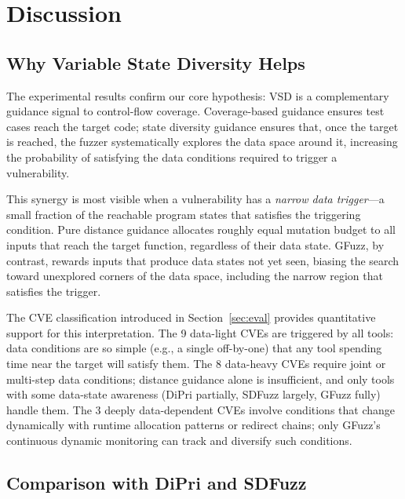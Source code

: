 \documentclass[preprint,12pt,3p]{elsarticle}
\begin{document}
\section{Discussion}
\label{sec:discuss}

\subsection{Why Variable State Diversity Helps}

The experimental results confirm our core hypothesis: VSD is a complementary
guidance signal to control-flow coverage.  Coverage-based guidance ensures
test cases reach the target code; state diversity guidance ensures that, once
the target is reached, the fuzzer systematically explores the data space
around it, increasing the probability of satisfying the data conditions
required to trigger a vulnerability.

This synergy is most visible when a vulnerability has a \emph{narrow data
trigger}---a small fraction of the reachable program states that satisfies
the triggering condition.  Pure distance guidance allocates roughly equal
mutation budget to all inputs that reach the target function, regardless of
their data state.  GFuzz, by contrast, rewards inputs that produce data
states not yet seen, biasing the search toward unexplored corners of the
data space, including the narrow region that satisfies the trigger.

The CVE classification introduced in Section~\ref{sec:eval} provides
quantitative support for this interpretation.  The 9 data-light CVEs are
triggered by all tools: data conditions are so simple (e.g., a single
off-by-one) that any tool spending time near the target will satisfy them.
The 8 data-heavy CVEs require joint or multi-step data conditions; distance
guidance alone is insufficient, and only tools with some data-state awareness
(DiPri partially, SDFuzz largely, GFuzz fully) handle them.  The 3 deeply
data-dependent CVEs involve conditions that change dynamically with runtime
allocation patterns or redirect chains; only GFuzz's continuous dynamic
monitoring can track and diversify such conditions.

\subsection{Comparison with DiPri and SDFuzz}
\end{document}
